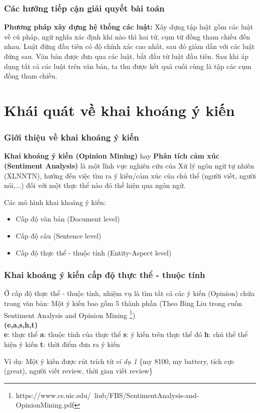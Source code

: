 \documentclass{beamer}
\begin{document}
\begin{frame}
\frametitle{Các hướng tiếp cận giải quyết bài toán}
\begin{block}{}
\textbf{Phương pháp xây dựng hệ thống các luật:} Xây dựng tập luật gồm các luật về cú pháp, ngữ nghĩa xác định khi nào thì hai từ, cụm từ đồng tham chiếu đến nhau. Luật đứng đầu tiên có độ chính xác cao nhất, sau đó giảm dần với các luật đứng sau. Văn bản được đưa qua các luật, bắt đầu từ luật đầu tiên. Sau khi áp dụng tất cả các luật trên văn bản, ta thu được kết quả cuối cùng là tập các cụm đồng tham chiếu.
\end{block}
\end{frame}

\section{Khái quát về khai khoáng ý kiến}
\begin{frame}
\frametitle{Giới thiệu về khai khoáng ý kiến}
\begin{block}{}
\textbf{Khai khoáng ý kiến (Opinion Mining)} hay \textbf{Phân tích cảm xúc (Sentiment Analysis)} là một lĩnh vực nghiên cứu của Xử lý ngôn ngữ tự nhiên (XLNNTN), hướng đến việc tìm ra ý kiến/cảm xúc của chủ thể (người viết, người nói,...) đối với một thực thể nào đó thể hiện qua ngôn ngữ.
\end{block}
\begin{block}{}
Các mô hình khai khoáng ý kiến:
\begin{itemize}
\item{Cấp độ văn bản (Document level)}
\item{Cấp độ câu (Sentence level)}
\item{Cấp độ thực thể - thuộc tính (Entity-Aspect level)}
\end{itemize}
\end{block}
\end{frame}

\begin{frame}
\frametitle{Khai khoáng ý kiến cấp độ thực thể - thuộc tính}
\begin{block}{}
Ở cấp độ thực thể - thuộc tính, nhiệm vụ là tìm tất cả các ý kiến (Opinion) chứa trong văn bản: Một ý kiến bao gồm 5 thành phần (Theo Bing Liu trong cuốn Sentiment Analysis and Opinion Mining \footnote{https://www.cs.uic.edu/~liub/FBS/SentimentAnalysis-and-OpinionMining.pdf})
\\\textbf{(e,a,s,h,t)}
\\\textbf{e}: thực thể
\textbf{a}: thuộc tính của thực thể
\textbf{s}: ý kiến trên thực thể đó
\textbf{h}: chủ thể thể hiện ý kiến
\textbf{t}: thời điểm đưa ra ý kiến
\end{block}
\begin{block}{}
Ví dụ: Một ý kiến được rút trích từ \textit{ví dụ 1} \{my 8100, my battery, tích cực (great), người viết review, thời gian viết review\}
\end{block}
\end{frame}
\end{document}
